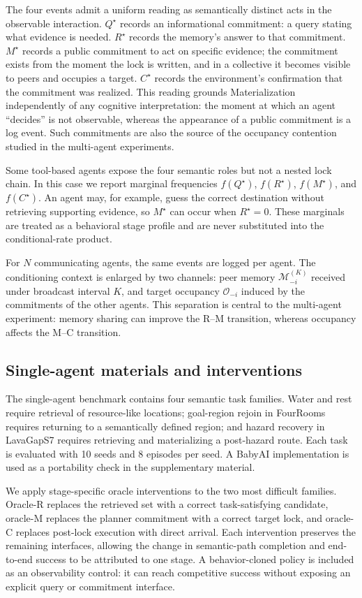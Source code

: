 \documentclass{article}
\begin{document}
The four events admit a uniform reading as semantically distinct acts in the observable interaction. $Q^\star$ records an informational commitment: a query stating what evidence is needed. $R^\star$ records the memory's answer to that commitment. $M^\star$ records a public commitment to act on specific evidence; the commitment exists from the moment the lock is written, and in a collective it becomes visible to peers and occupies a target. $C^\star$ records the environment's confirmation that the commitment was realized. This reading grounds Materialization independently of any cognitive interpretation: the moment at which an agent ``decides'' is not observable, whereas the appearance of a public commitment is a log event. Such commitments are also the source of the occupancy contention studied in the multi-agent experiments.

Some tool-based agents expose the four semantic roles but not a nested lock chain. In this case we report marginal frequencies $f(Q^\star)$, $f(R^\star)$, $f(M^\star)$, and $f(C^\star)$. An agent may, for example, guess the correct destination without retrieving supporting evidence, so $M^\star$ can occur when $R^\star=0$. These marginals are treated as a behavioral stage profile and are never substituted into the conditional-rate product.

For $N$ communicating agents, the same events are logged per agent. The conditioning context is enlarged by two channels: peer memory $\mathcal{M}^{(K)}_{-i}$ received under broadcast interval $K$, and target occupancy $\mathcal{O}_{-i}$ induced by the commitments of the other agents. This separation is central to the multi-agent experiment: memory sharing can improve the R--M transition, whereas occupancy affects the M--C transition.

\subsection{Single-agent materials and interventions}

The single-agent benchmark contains four semantic task families. Water and rest require retrieval of resource-like locations; goal-region rejoin in FourRooms requires returning to a semantically defined region; and hazard recovery in LavaGapS7 requires retrieving and materializing a post-hazard route. Each task is evaluated with 10 seeds and 8 episodes per seed. A BabyAI implementation is used as a portability check in the supplementary material.

We apply stage-specific oracle interventions to the two most difficult families. Oracle-R replaces the retrieved set with a correct task-satisfying candidate, oracle-M replaces the planner commitment with a correct target lock, and oracle-C replaces post-lock execution with direct arrival. Each intervention preserves the remaining interfaces, allowing the change in semantic-path completion and end-to-end success to be attributed to one stage. A behavior-cloned policy is included as an observability control: it can reach competitive success without exposing an explicit query or commitment interface.
\end{document}
